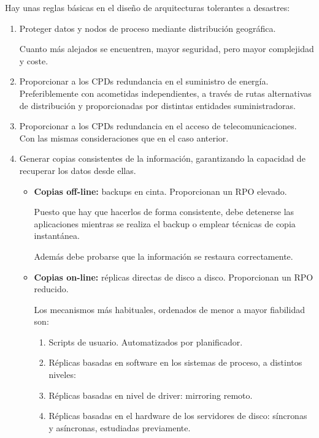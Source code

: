 \documentclass{apuntes}[nochap]
\begin{document}
Hay unas reglas básicas en el diseño de arquitecturas tolerantes a desastres:
\begin{enumerate}
\item Proteger datos y nodos de proceso mediante distribución geográfica.

Cuanto más alejados se encuentren, mayor seguridad, pero mayor
complejidad y coste.

\item Proporcionar a los CPDs redundancia en el suministro de energía.
Preferiblemente con acometidas independientes, a través de rutas alternativas de
distribución y proporcionadas por distintas entidades suministradoras.

\item Proporcionar a los CPDs redundancia en el acceso de telecomunicaciones. Con
las mismas consideraciones que en el caso anterior.

\item Generar copias consistentes de la información, garantizando la capacidad de
recuperar los datos desde ellas.
\begin{itemize}
\item \textbf{Copias off-line:} backups en cinta. Proporcionan un RPO elevado.

Puesto que hay que hacerlos de forma consistente, debe detenerse las aplicaciones mientras se realiza el backup o emplear técnicas de copia instantánea.

Además debe probarse que la información se restaura correctamente.

\item \textbf{Copias on-line:} réplicas directas de disco a disco. Proporcionan un RPO reducido.

Los mecanismos más habituales, ordenados de menor a mayor fiabilidad son:
\begin{enumerate}
\item Scripts de usuario. Automatizados por planificador.
\item Réplicas basadas en software en los sistemas de proceso, a distintos niveles:

\item Réplicas basadas en nivel de driver: mirroring remoto.
\item Réplicas basadas en el hardware de los servidores de disco: síncronas y
asíncronas, estudiadas previamente.
\end{enumerate}
\end{itemize}

\end{enumerate}
\end{document}
